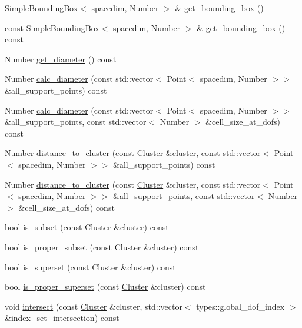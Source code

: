 \begin{DoxyCompactItemize}
\item 
\hyperlink{classSimpleBoundingBox}{Simple\+Bounding\+Box}$<$ spacedim, Number $>$ \& \hyperlink{classCluster_a062a81f89fcb644c98f94fdf20ebcced}{get\+\_\+bounding\+\_\+box} ()
\item 
const \hyperlink{classSimpleBoundingBox}{Simple\+Bounding\+Box}$<$ spacedim, Number $>$ \& \hyperlink{classCluster_ad720b2126e07c5698c1fc39ac3f1e6a4}{get\+\_\+bounding\+\_\+box} () const
\item 
Number \hyperlink{classCluster_aab3f02640b57812eb697c39e8c4cc2e3}{get\+\_\+diameter} () const
\item 
Number \hyperlink{classCluster_a2204e6b5cf593d9e93a56f9269d74b4c}{calc\+\_\+diameter} (const std\+::vector$<$ Point$<$ spacedim, Number $>$$>$ \&all\+\_\+support\+\_\+points) const
\item 
Number \hyperlink{classCluster_ab9900a870bdd05d4638b820716e03293}{calc\+\_\+diameter} (const std\+::vector$<$ Point$<$ spacedim, Number $>$$>$ \&all\+\_\+support\+\_\+points, const std\+::vector$<$ Number $>$ \&cell\+\_\+size\+\_\+at\+\_\+dofs) const
\item 
Number \hyperlink{classCluster_aba84e3743344f360ccdb855037e1b45e}{distance\+\_\+to\+\_\+cluster} (const \hyperlink{classCluster}{Cluster} \&cluster, const std\+::vector$<$ Point$<$ spacedim, Number $>$$>$ \&all\+\_\+support\+\_\+points) const
\item 
Number \hyperlink{classCluster_a1eeffaea84b84d0288544dd4ff007d7b}{distance\+\_\+to\+\_\+cluster} (const \hyperlink{classCluster}{Cluster} \&cluster, const std\+::vector$<$ Point$<$ spacedim, Number $>$$>$ \&all\+\_\+support\+\_\+points, const std\+::vector$<$ Number $>$ \&cell\+\_\+size\+\_\+at\+\_\+dofs) const
\item 
bool \hyperlink{classCluster_a8cbdd8366b60c14f44a951ebfe024bb5}{is\+\_\+subset} (const \hyperlink{classCluster}{Cluster} \&cluster) const
\item 
bool \hyperlink{classCluster_aaf45b6f7d9e629dd2fe648dd0231a559}{is\+\_\+proper\+\_\+subset} (const \hyperlink{classCluster}{Cluster} \&cluster) const
\item 
bool \hyperlink{classCluster_abdc3b12ac53ba6fba8479a9bbd9b6aa2}{is\+\_\+superset} (const \hyperlink{classCluster}{Cluster} \&cluster) const
\item 
bool \hyperlink{classCluster_adfabc1eae12e962bae4af0a1854c3795}{is\+\_\+proper\+\_\+superset} (const \hyperlink{classCluster}{Cluster} \&cluster) const
\item 
void \hyperlink{classCluster_a47961c1b0a34b58266aa3bd87fd36b32}{intersect} (const \hyperlink{classCluster}{Cluster} \&cluster, std\+::vector$<$ types\+::global\+\_\+dof\+\_\+index $>$ \&index\+\_\+set\+\_\+intersection) const

\end{DoxyCompactItemize}
